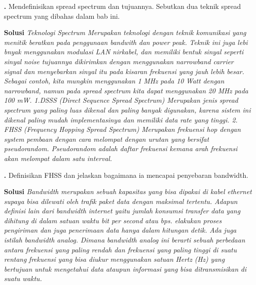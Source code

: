 \documentclass[oneside]{book}
\newcommand{\exercisename}{Latihan}
\newcommand{\solutionname}{Solusi}
\newcounter{exer}[chapter]
\renewcommand{\theexer}{\thechapter.\arabic{exer}}
\newenvironment{exercise}[1][]{
  \refstepcounter{exer}
  \par\noindent\textbf{\color{main}{\exercisename} \theexer #1 }\rmfamily}{
  \par\ignorespacesafterend}
\newenvironment{solution}{\par\noindent\textbf{\color{main}\solutionname} \em}{\par}
\begin{document}
\begin{exercise}
  Mendefinisikan spread spectrum dan tujuannya. Sebutkan dua teknik spread spectrum yang dibahas dalam bab ini.
\end{exercise}

\begin{solution}
  Teknologi Spectrum Merupakan teknologi dengan teknik komunikasi yang menitik beratkan pada penggunaan bandwith dan power peak. Teknik ini juga lebi bnyak menggunakan modulasi LAN nirkabel, dan memiliki bentuk sinyal seperti sinyal noise tujuannya dikirimkan dengan menggunakan narrowband carrier signal dan menyebarkan sinyal itu pada kisaran frekuensi yang jauh lebih besar. Sebagai contoh, kita mungkin menggunakan 1 MHz pada 10 Watt dengan narrowband, namun pada spread spectrum kita dapat menggunakan 20 MHz pada 100 mW.
  1.DSSS (Direct Sequence Spread Spectrum)
  Merupakan jenis spread spectrum yang paling luas dikenal dan paling banyak digunakan, karena sistem ini dikenal paling mudah implementasinya dan memiliki data rate yang tinggi.
  2. FHSS (Frequency Hopping Spread Spectrum)
  Merupakan frekuensi hop dengan system pembaan dengan cara melompat dengan urutan yang bersifat pseudorandom. Pseudorandom adalah daftar frekuensi kemana arah frekuensi akan melompat dalam satu interval.
\end{solution}

\vspace{12pt}

\begin{exercise}
  Definisikan FHSS dan jelaskan bagaimana ia mencapai penyebaran bandwidth.
\end{exercise}

\begin{solution}
  Bandwidth merupakan sebuah kapasitas yang bisa dipakai di kabel ethernet supaya bisa dilewati oleh trafik paket data dengan maksimal tertentu. Adapun definisi lain dari bandwidth internet yaitu jumlah konsumsi transfer data yang dihitung di dalam satuan waktu bit per second atau bps. elakukan proses pengiriman dan juga penerimaan data hanya dalam hitungan detik. Ada juga istilah bandwidth analog. Dimana bandwidth analog ini berarti sebuah perbedaan antara frekuensi yang paling rendah dan frekuensi yang paling tinggi di suatu rentang frekuensi yang bisa diukur menggunakan satuan Hertz (Hz) yang bertujuan untuk mengetahui data ataupun informasi yang bisa ditransmisikan di suatu waktu.
\end{solution}

\vspace{12pt}
\end{document}
